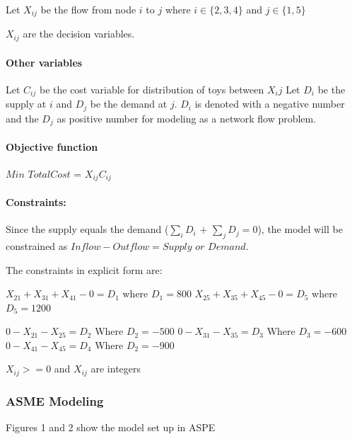 \documentclass[]{article}
\let\oldparagraph\paragraph
\renewcommand{\paragraph}[1]{\oldparagraph{#1}\mbox{}}
\begin{document}
Let \(X_{ij}\) be the flow from node \(i\) to \(j\) where
\(i\in \{2,3,4\}\) and \(j \in \{1,5\}\)

\(X_{ij}\) are the decision variables.

\paragraph{Other variables}\label{other-variables}

Let \(C_{ij}\) be the cost variable for distribution of toys between
\(X_ij\) Let \(D_{i}\) be the supply at \(i\) and \(D_{j}\) be the
demand at \(j\). \(D_{i}\) is denoted with a negative number and the
\(D_{j}\) as positive number for modeling as a network flow problem.

\paragraph{Objective function}\label{objective-function}

\(Min\) \(Total Cost\) = \(X_{ij}C_{ij}\)

\paragraph{Constraints:}\label{constraints}

Since the supply equals the demand (\(\sum_{i}D_{i}\) \(+\)
\(\sum_{j}D_{j} = 0\)), the model will be constrained as
\(Inflow - Outflow = Supply\) \(or\) \(Demand\).

The constraints in explicit form are:

\(X_{21} + X_{31} + X_{41} - 0 = D_{1}\) where \(D_{1} = 800\)
\(X_{25} + X_{35} + X_{45} - 0 = D_{5}\) where \(D_{5} = 1200\)

\(0 - X_{21} - X_{25} = D_{2}\) Where \(D_{2} = -500\)
\(0 - X_{31} - X_{35} = D_{3}\) Where \(D_{3} = -600\)
\(0 - X_{41} - X_{45} = D_{4}\) Where \(D_{2} = -900\)

\(X_{ij} > = 0\) and \(X_{ij}\) are integers

\subsubsection{ASME Modeling}\label{asme-modeling}

Figures 1 and 2 show the model set up in ASPE
\end{document}

